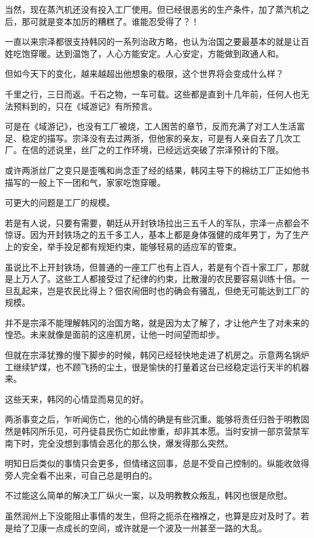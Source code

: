 当然，现在蒸汽机还没有投入工厂使用。但已经很恶劣的生产条件，加了蒸汽机之后，那可就是变本加厉的糟糕了。谁能忍受得了？！

一直以来宗泽都很支持韩冈的一系列治政方略，也认为治国之要最基本的就是让百姓吃饱穿暖。达到温饱了，人心方能安定。人心安定，方能做到政通人和。

但如今天下的变化，越来越超出他想象的极限，这个世界将会变成什么样？

千里之行，三日而返。千石之物，一车可载。这些都是直到十几年前，任何人也无法预料到的，只在《域游记》有所预言。

可是在《域游记》，也没有工厂被烧，工人困苦的章节，反而充满了对工人生活富足、稳定的描写。宗泽没有去过两浙，但他家的亲友，可是有人亲自去了几次工厂。在信的述说里，丝厂之的工作环境，已经远远突破了宗泽预计的下限。

或许两浙丝厂之变只是歪嘴和尚念歪了经的结果，韩冈主导下的棉纺工厂正如他书描写的一般上下一团和气，家家吃饱穿暖。

可更大的问题是工厂的规模。

若是有人说，只要有需要，朝廷从开封铁场拉出三五千人的军队，宗泽一点都会不惊讶。因为开封铁场之的五千多工人，基本上都是身体强健的成年男丁，为了生产上的安全，举手投足都有规矩约束，能够轻易的适应军的管束。

虽说比不上开封铁场，但普通的一座工厂也有上百人，若是有个百十家工厂，那就是上万人了。这些工人都接受过了纪律的约束，比散漫的农民要容易训练十倍。一旦乱起来，岂是农民比得上？佃农闹佃时也的确会有骚乱，但绝无可能达到工厂的规模。

并不是宗泽不能理解韩冈的治国方略，就是因为太了解了，才让他产生了对未来的惶恐。未来就像是面前的这座机房，让他一时间望而却步。

但就在宗泽犹豫的慢下脚步的时候，韩冈已经轻快地走进了机房之。示意两名锅炉工继续铲煤，也不顾飞扬的尘土，很是愉快的打量着这台已经稳定运行天半的机器来。

这些天来，韩冈的心情显而易见的好。

两浙事变之后，乍听闻伤亡，他的心情的确是有些沉重。能够将责任归咎于明教固然是韩冈所乐见，可丹徒县民伤亡如此惨重，却非其本愿。当时安排一部京营禁军南下时，完全没想到事情会恶化的那么快，爆发得那么突然。

明知日后类似的事情只会更多，但情绪这回事，总是不受自己控制的。纵能收敛得旁人完全看不出来，可自己总是明白的。

不过能这么简单的解决工厂纵火一案，以及明教教众叛乱，韩冈也很是欣慰。

虽然润州上下没能阻止事情的发生，但将之扼杀在襁褓之，也算是应对及时了。若是给了卫康一点成长的空间，或许就是一个波及一州甚至一路的大乱。


